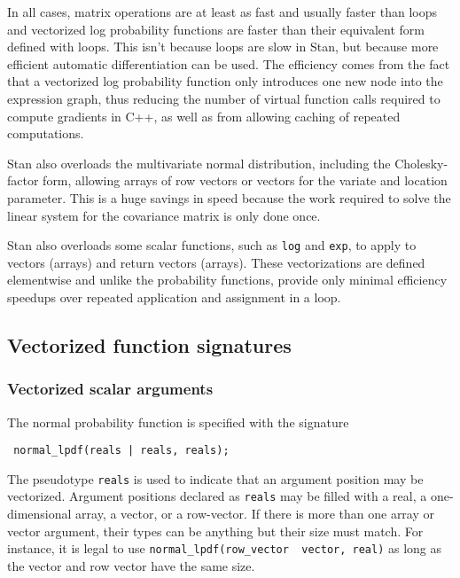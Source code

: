 \documentclass[
  10pt,
]{book}
\begin{document}
In all cases, matrix operations are at least as fast and usually
faster than loops and vectorized log probability functions are faster
than their equivalent form defined with loops. This isn't because
loops are slow in Stan, but because more efficient automatic
differentiation can be used. The efficiency comes from the fact that
a vectorized log probability function only introduces one new node into
the expression graph, thus reducing the number of virtual function
calls required to compute gradients in C++, as well as from allowing
caching of repeated computations.

Stan also overloads the multivariate normal distribution, including
the Cholesky-factor form, allowing arrays of row vectors or vectors
for the variate and location parameter. This is a huge savings in
speed because the work required to solve the linear system for the
covariance matrix is only done once.

Stan also overloads some scalar functions, such as \texttt{log} and \texttt{exp}, to
apply to vectors (arrays) and return vectors (arrays). These
vectorizations are defined elementwise and unlike the probability
functions, provide only minimal efficiency speedups over repeated
application and assignment in a loop.

\hypertarget{prob-vectorization}{%
\subsection{Vectorized function signatures}\label{prob-vectorization}}

\hypertarget{vectorized-scalar-arguments}{%
\subsubsection{Vectorized scalar arguments}\label{vectorized-scalar-arguments}}

The normal probability function is specified with the signature

\begin{verbatim}
 normal_lpdf(reals | reals, reals);
\end{verbatim}

The pseudotype \texttt{reals} is used to indicate that an argument position
may be vectorized. Argument positions declared as \texttt{reals} may be
filled with a real, a one-dimensional array, a vector, or a
row-vector. If there is more than one array or vector argument, their
types can be anything but their size must match. For instance, it is
legal to use \texttt{normal\_lpdf(row\_vector\ \textbar{}\ vector,\ real)} as long as the
vector and row vector have the same size.
\end{document}
